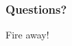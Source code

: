 \documentclass[10pt]{beamer}
\begin{document}
\begin{frame}
	\frametitle{Questions?}
	\begin{center}
		Fire away!
	\end{center}
\end{frame}


\end{document}
